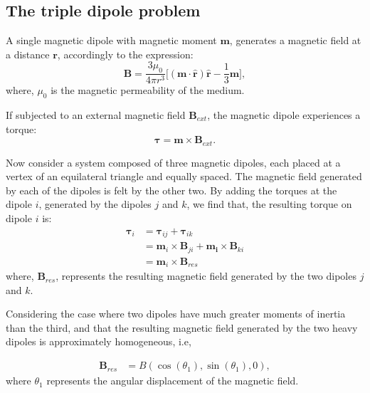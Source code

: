 
\subsection{The triple dipole problem}

A single magnetic dipole with magnetic moment $\boldsymbol{m}$, generates a magnetic field at a distance $\boldsymbol{r}$, accordingly to the expression: 
\begin{equation}
    \boldsymbol{B} = \dfrac{3\mu_0}{4 \pi r^3}\bigg[ (\boldsymbol{m \cdot \hat{r}})\boldsymbol{\hat{r}} - \dfrac{1}{3}\boldsymbol{m} \bigg],
    \label{eq:MagneticFieldDipole}
\end{equation}
where, $\mu_0$ is the magnetic permeability of the medium. 

If subjected to an external magnetic field $\boldsymbol{B}_{ext}$, the magnetic dipole experiences a torque: 
\begin{equation}
    \boldsymbol{\tau} = \boldsymbol{m} \times \boldsymbol{B}_{ext}.
    \label{eq:NewtonSecondLaw}
\end{equation}

Now consider a system composed of three magnetic dipoles, each placed at a vertex of an equilateral triangle and equally spaced. The magnetic field generated by each of the dipoles is felt by the other two. By adding the torques at the dipole $i$, generated by the dipoles $j$ and $k$, we find that, the resulting torque on dipole $i$ is:
\begin{equation}
    \begin{aligned}
        \boldsymbol{\tau}_i &= \boldsymbol{\tau}_{ij} + \boldsymbol{\tau}_{ik}\\
            & =  \boldsymbol{m}_i \times \boldsymbol{B}_{j i}+\boldsymbol{m_i} \times \boldsymbol{B}_{k i}\\
            &= \boldsymbol{m}_i \times \boldsymbol{B}_{res}
    \end{aligned}
    \label{eq:Torques}
\end{equation}
where, $\boldsymbol{B}_{res}$, represents the resulting magnetic field generated by the two dipoles $j$ and $k$. 

Considering the case where two dipoles have much greater moments of inertia than the third, and that the resulting magnetic field generated by the two heavy dipoles is approximately homogeneous, i.e,

\begin{equation}
    \begin{aligned}
        \boldsymbol{B}_{res} &= B(\cos(\theta_1),\sin(\theta_1), 0),
    \end{aligned}
    \label{eq:Hipotesys}
\end{equation}
where $\theta_1$ represents the angular displacement of the magnetic field.

